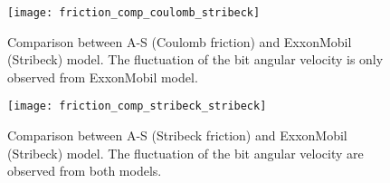 \begin{figure}
	\centering
	\texttt{[image: friction\_comp\_coulomb\_stribeck]}
    \caption[Comparison between A-S (Coulomb friction) and ExxonMobil (Stribeck friction) model.]{Comparison between A-S (Coulomb friction) and ExxonMobil (Stribeck) model. The fluctuation of the bit angular velocity is only observed from ExxonMobil model.}\label{figure_coloumb_coulomb}
\end{figure}

\begin{figure}
	\centering
	\texttt{[image: friction\_comp\_stribeck\_stribeck]}
    \caption[Comparison between A-S (Stribeck friction) and ExxonMobil (Stribeck friction) model.]{Comparison between A-S (Stribeck friction) and ExxonMobil (Stribeck) model. The fluctuation of the bit angular velocity are observed from both models.}
    \label{figure_coulomb_stribeck}
\end{figure}

